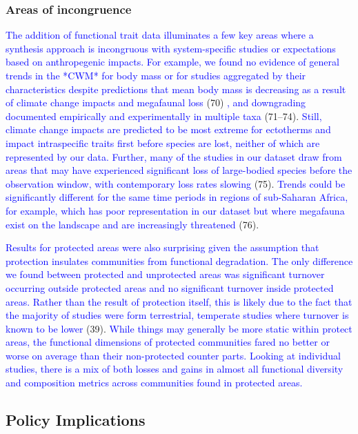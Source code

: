 \documentclass{article}
\begin{document}
\hypertarget{areas-of-incongruence}{%
\subsubsection{Areas of incongruence}\label{areas-of-incongruence}}

\textcolor{blue}{The addition of functional trait data illuminates a few key areas where a synthesis approach is incongruous with system-specific studies or expectations based on anthropegenic impacts. For example, we found no evidence of general trends in the *CWM* for body mass or for studies aggregated by their characteristics despite predictions that mean body mass is decreasing as a result of climate change impacts and megafaunal loss }(70)
\textcolor{blue}{, and downgrading documented empirically and experimentally in multiple taxa }(71--74).
\textcolor{blue}{Still, climate change impacts are predicted to be most extreme for ectotherms and impact intraspecific traits first before species are lost, neither of which are represented by our data. Further, many of the studies in our dataset draw from areas that may have experienced significant loss of large-bodied species before the observation window, with contemporary loss rates slowing}
(75).
\textcolor{blue}{Trends could be significantly different for the same time periods in regions of sub-Saharan Africa, for example, which has poor representation in our dataset but where megafauna exist on the landscape and are increasingly threatened}
(76).

\textcolor{blue}{Results for protected areas were also surprising given the assumption that protection insulates communities from functional degradation. The only difference we found between protected and unprotected areas was significant turnover occurring outside protected areas and no significant turnover inside protected areas. Rather than the result of protection itself, this is likely due to the fact that the majority of studies were form terrestrial, temperate studies where turnover is known to be lower }(39).
\textcolor{blue}{While things may generally be more static within protect areas, the functional dimensions of protected communities fared no better or worse on average than their non-protected counter parts. Looking at individual studies, there is a mix of both losses and gains in almost all functional diversity and composition metrics across communities found in protected areas.}

\hypertarget{policy-implications}{%
\subsection{Policy Implications}\label{policy-implications}}
\end{document}
